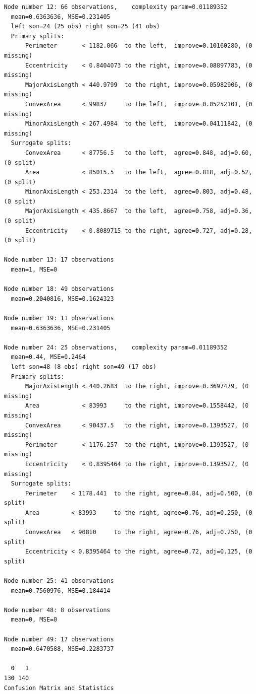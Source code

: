 \documentclass{article}
\begin{document}
\begin{thebibliography}{9}
\begin{verbatim}
Node number 12: 66 observations,    complexity param=0.01189352
  mean=0.6363636, MSE=0.231405 
  left son=24 (25 obs) right son=25 (41 obs)
  Primary splits:
      Perimeter       < 1182.066  to the left,  improve=0.10160280, (0 missing)
      Eccentricity    < 0.8404073 to the right, improve=0.08897783, (0 missing)
      MajorAxisLength < 440.9799  to the right, improve=0.05982906, (0 missing)
      ConvexArea      < 99837     to the left,  improve=0.05252101, (0 missing)
      MinorAxisLength < 267.4984  to the left,  improve=0.04111842, (0 missing)
  Surrogate splits:
      ConvexArea      < 87756.5   to the left,  agree=0.848, adj=0.60, (0 split)
      Area            < 85015.5   to the left,  agree=0.818, adj=0.52, (0 split)
      MinorAxisLength < 253.2314  to the left,  agree=0.803, adj=0.48, (0 split)
      MajorAxisLength < 435.8667  to the left,  agree=0.758, adj=0.36, (0 split)
      Eccentricity    < 0.8089715 to the right, agree=0.727, adj=0.28, (0 split)

Node number 13: 17 observations
  mean=1, MSE=0 

Node number 18: 49 observations
  mean=0.2040816, MSE=0.1624323 

Node number 19: 11 observations
  mean=0.6363636, MSE=0.231405 

Node number 24: 25 observations,    complexity param=0.01189352
  mean=0.44, MSE=0.2464 
  left son=48 (8 obs) right son=49 (17 obs)
  Primary splits:
      MajorAxisLength < 440.2683  to the right, improve=0.3697479, (0 missing)
      Area            < 83993     to the right, improve=0.1558442, (0 missing)
      ConvexArea      < 90437.5   to the right, improve=0.1393527, (0 missing)
      Perimeter       < 1176.257  to the right, improve=0.1393527, (0 missing)
      Eccentricity    < 0.8395464 to the right, improve=0.1393527, (0 missing)
  Surrogate splits:
      Perimeter    < 1178.441  to the right, agree=0.84, adj=0.500, (0 split)
      Area         < 83993     to the right, agree=0.76, adj=0.250, (0 split)
      ConvexArea   < 90810     to the right, agree=0.76, adj=0.250, (0 split)
      Eccentricity < 0.8395464 to the right, agree=0.72, adj=0.125, (0 split)

Node number 25: 41 observations
  mean=0.7560976, MSE=0.184414 

Node number 48: 8 observations
  mean=0, MSE=0 

Node number 49: 17 observations
  mean=0.6470588, MSE=0.2283737 

  0   1 
130 140 
Confusion Matrix and Statistics


\end{verbatim}
\end{thebibliography}
\end{document}
